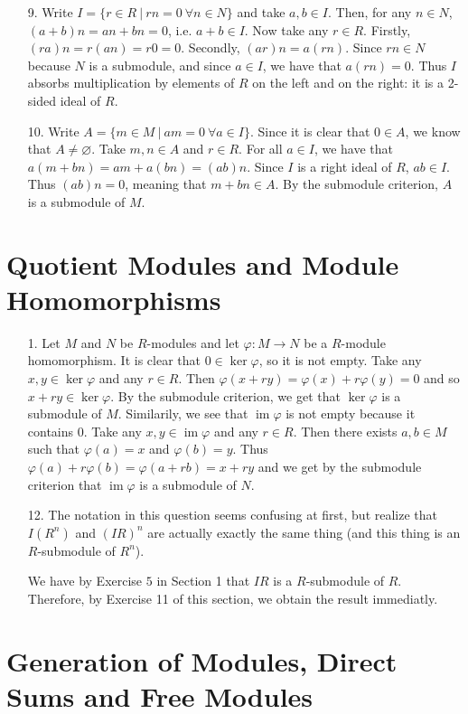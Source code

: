 \documentclass{report}
\DeclareMathOperator{\im}{im}
\begin{document}
\begin{enumerate}
\item[9.]
Write $I = \{r\in R\ |\ rn = 0\ \forall n\in N\}$ and take $a,b\in I$. Then, for any $n\in N$, $(a+b)n = an+bn=0$, i.e. $a+b \in I$. Now take any $r\in R$. Firstly, $(ra)n = r(an) = r0 = 0$. Secondly, $(ar)n = a(rn)$. Since $rn \in N$ because $N$ is a submodule, and since $a\in I$, we have that $a(rn)=0$. Thus $I$ absorbs multiplication by elements of $R$ on the left and on the right: it is a 2-sided ideal of $R$.

\item[10.]
Write $A=\{m\in M\ |\ am=0\ \forall a\in I\}$. Since it is clear that $0\in A$, we know that $A\neq\varnothing$. Take $m,n\in A$ and $r \in R$. For all $a\in I$, we have that $a(m+bn) = am+a(bn) = (ab)n$. Since $I$ is a right ideal of $R$, $ab\in I$. Thus $(ab)n=0$, meaning that $m+bn\in A$. By the submodule criterion, $A$ is a submodule of $M$.
\end{enumerate}

\section{Quotient Modules and Module Homomorphisms}

\begin{enumerate}
\item[1.]
Let $M$ and $N$ be $R$-modules and let $\varphi:M\to N$ be a $R$-module homomorphism. It is clear that $0\in\ker\varphi$, so it is not empty. Take any $x,y\in\ker\varphi$ and any $r\in R$. Then $\varphi(x+ry) = \varphi(x)+r\varphi(y)=0$ and so $x+ry\in\ker\varphi$. By the submodule criterion, we get that $\ker\varphi$ is a submodule of $M$.
Similarily, we see that $\im\varphi$ is not empty because it contains $0$. Take any $x,y\in \im\varphi$ and any $r\in R$. Then there exists $a,b\in M$ such that $\varphi(a)=x$ and $\varphi(b)=y$. Thus $\varphi(a)+r\varphi(b) = \varphi(a+rb)=x+ry$ and we get by the submodule criterion that $\im\varphi$ is a submodule of $N$.

\item[12.]
The notation in this question seems confusing at first, but realize that $I(R^n)$ and $(IR)^n$ are actually exactly the same thing (and this thing is an $R$-submodule of $R^n$).

We have by Exercise $5$ in Section 1 that $IR$ is a $R$-submodule of $R$. Therefore, by Exercise 11 of this section, we obtain the result immediatly.
\end{enumerate}

\section{Generation of Modules, Direct Sums and Free Modules}
\end{document}
